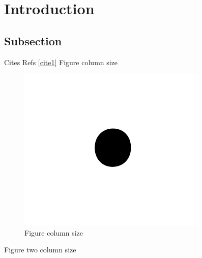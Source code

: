 \section{Introduction}
\label{sec:introduction}



\subsection{Subsection}
%
%
Cites \cite{moritz2018ray} \label{cite1}
%
%
Refs \ref{cite1}
%
%
Figure column size
%
\begin{figure}
\begin{center}
    \includegraphics[width=\columnwidth]{static/figs/fig1.png}
    \caption{Figure column size}
\label{fig:single_column}
\end{center}
\end{figure}
%
Figure two column size
%
